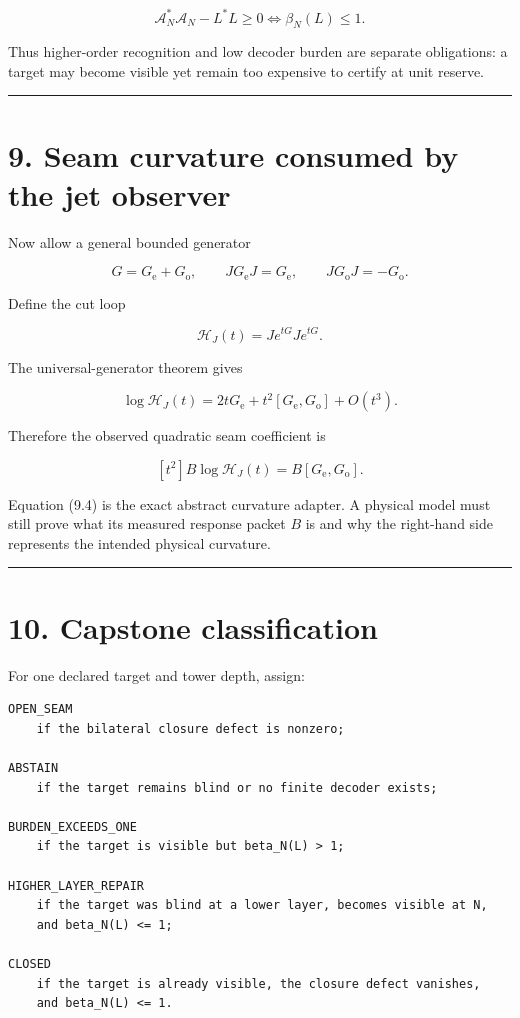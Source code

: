 \[
\boxed{
\mathcal A_N^*\mathcal A_N-L^*L\ge0
\iff
\beta_N(L)\le1.
}
\tag{8.2}
\]

Thus higher-order recognition and low decoder burden are separate obligations:
a target may become visible yet remain too expensive to certify at unit
reserve.

\begin{center}\rule{0.5\linewidth}{0.5pt}\end{center}

\hypertarget{seam-curvature-consumed-by-the-jet-observer}{%
\section{9. Seam curvature consumed by the jet observer}\label{seam-curvature-consumed-by-the-jet-observer}}

Now allow a general bounded generator

\[
G=G_{\mathrm e}+G_{\mathrm o},
\qquad
JG_{\mathrm e}J=G_{\mathrm e},
\qquad
JG_{\mathrm o}J=-G_{\mathrm o}.
\tag{9.1}
\]

Define the cut loop

\[
\mathscr H_J(t)=Je^{tG}Je^{tG}.
\tag{9.2}
\]

The universal-generator theorem gives

\[
\log\mathscr H_J(t)
=
2tG_{\mathrm e}
+t^2[G_{\mathrm e},G_{\mathrm o}]
+O(t^3).
\tag{9.3}
\]

Therefore the observed quadratic seam coefficient is

\[
\boxed{
[t^2]B\log\mathscr H_J(t)
=B[G_{\mathrm e},G_{\mathrm o}].
}
\tag{9.4}
\]

Equation (9.4) is the exact abstract curvature adapter. A physical model must
still prove what its measured response packet \(B\) is and why the right-hand
side represents the intended physical curvature.

\begin{center}\rule{0.5\linewidth}{0.5pt}\end{center}

\hypertarget{capstone-classification}{%
\section{10. Capstone classification}\label{capstone-classification}}

For one declared target and tower depth, assign:

\begin{verbatim}
OPEN_SEAM
    if the bilateral closure defect is nonzero;

ABSTAIN
    if the target remains blind or no finite decoder exists;

BURDEN_EXCEEDS_ONE
    if the target is visible but beta_N(L) > 1;

HIGHER_LAYER_REPAIR
    if the target was blind at a lower layer, becomes visible at N,
    and beta_N(L) <= 1;

CLOSED
    if the target is already visible, the closure defect vanishes,
    and beta_N(L) <= 1.
\end{verbatim}

